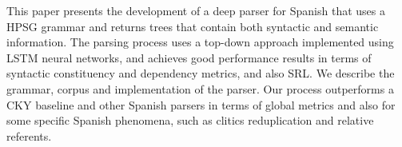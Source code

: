 This paper presents the development of a deep parser for Spanish that uses a HPSG grammar and returns trees that contain both syntactic and semantic information. The parsing process uses a top-down approach implemented using LSTM neural networks, and achieves good performance results in terms of syntactic constituency and dependency metrics, and also SRL. We describe the grammar, corpus and implementation of the parser. Our process outperforms a CKY baseline and other Spanish parsers in terms of global metrics and also for some specific Spanish phenomena, such as clitics reduplication and relative referents.
